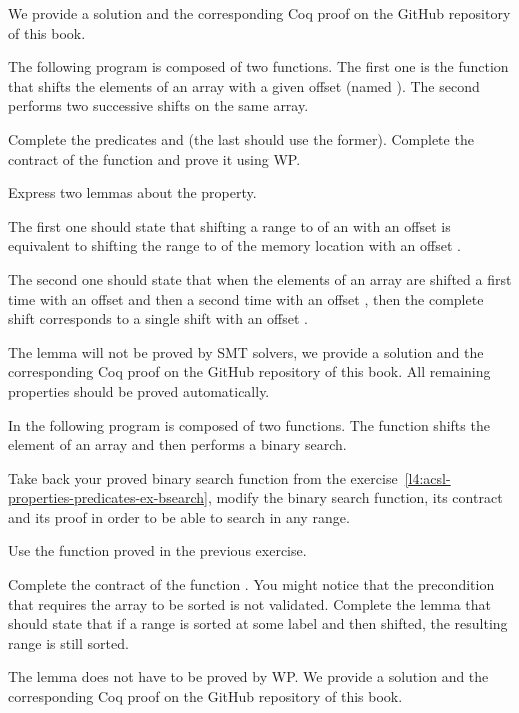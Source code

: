 We provide a solution and the corresponding Coq proof on the GitHub repository
of this book.


\label{l4:acsl-properties-lemmas-shift-trans}


The following program is composed of two functions. The first one is the
 function that shifts the elements of an array with a
given offset (named ). The second performs two successive
shifts on the same array.




Complete the predicates  and  (the
last should use the former). Complete the contract of the
 function and prove it using WP.


Express two lemmas about the  property.


The first one  should state that shifting a range
 to  of an  with an
offset  is equivalent to shifting the range  to
 of the memory location  with an offset
.



The second one should state that when the elements of an array are shifted a
first time with an offset  and then a second time with an offset
, then the complete shift corresponds to a single shift with an
offset .



The lemma  will not be proved by SMT solvers, we provide
a solution and the corresponding Coq proof on the GitHub repository of this
book. All remaining properties should be proved automatically.





In the following program is composed of two functions. The function
 shifts the element of an array and then
performs a binary search.




Take back your proved binary search function from the
exercise~\ref{l4:acsl-properties-predicates-ex-bsearch}, modify the binary
search function, its contract and its proof in order to be able to search in
any range.


Use the  function proved in the previous exercise.


Complete the contract of the function . You might
notice that the precondition that requires the array to be sorted is not
validated. Complete the lemma  that should
state that if a range is sorted at some label and then shifted, the resulting
range is still sorted.

The lemma does not have to be proved by WP. We provide a solution and the
corresponding Coq proof on the GitHub repository of this book.
